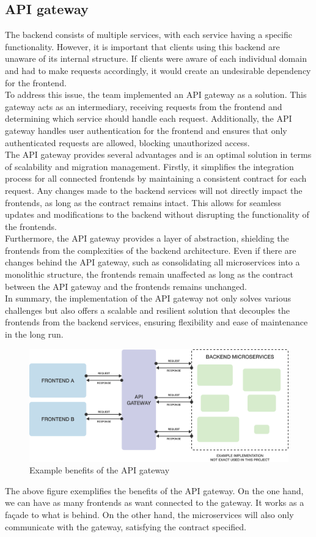 \documentclass[./chapters/design.tex]{subfiles}
\begin{document}
\subsection{API gateway}
The backend consists of multiple services, with each service having a specific
functionality. However, it is important that clients using this backend are
unaware of its internal structure. If clients were aware of each individual
domain and had to make requests accordingly, it would create an undesirable
dependency for the frontend.
\\[8pt]
To address this issue, the team implemented an API gateway as a solution. This
gateway acts as an intermediary, receiving requests from the frontend and
determining which service should handle each request. Additionally, the API
gateway handles user authentication for the frontend and ensures that only
authenticated requests are allowed, blocking unauthorized access.
\\[8pt]
The API gateway provides several advantages and is an optimal solution in terms
of scalability and migration management. Firstly, it simplifies the integration
process for all connected frontends by maintaining a consistent contract for
each request. Any changes made to the backend services will not directly impact
the frontends, as long as the contract remains intact. This allows for seamless
updates and modifications to the backend without disrupting the functionality of
the frontends.
\\[8pt]
Furthermore, the API gateway provides a layer of abstraction, shielding the
frontends from the complexities of the backend architecture. Even if there are
changes behind the API gateway, such as consolidating all microservices into a
monolithic structure, the frontends remain unaffected as long as the contract
between the API gateway and the frontends remains unchanged.
\\[8pt]
In summary, the implementation of the API gateway not only solves various
challenges but also offers a scalable and resilient solution that decouples the
frontends from the backend services, ensuring flexibility and ease of
maintenance in the long run.
\begin{figure}[H]
	\centering
	\includegraphics[width=\textwidth]{./assets/api-gateway.png}
	\caption{Example benefits of the API gateway}
\end{figure}
The above figure exemplifies the benefits of the API gateway. On the one hand,
we can have as many frontends as want connected to the gateway. It works as a
façade to what is behind. On the other hand, the microservices will also only
communicate with the gateway, satisfying the contract specified.
\end{document}

